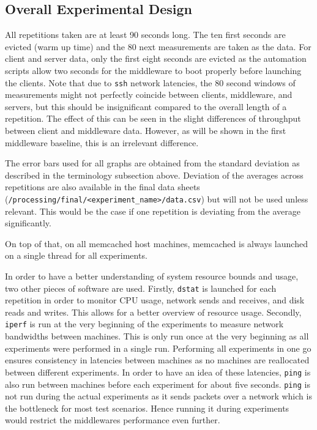\documentclass[11pt,a4paper]{article}
\begin{document}
\subsection{Overall Experimental Design}
All repetitions taken are at least 90 seconds long. The ten first seconds are evicted (warm up time) and the 80 next measurements are taken as the data. For client and server data, only the first eight seconds are evicted as the automation scripts allow two seconds for the middleware to boot properly before launching the clients. Note that due to \texttt{ssh} network latencies, the 80 second windows of measurements might not perfectly coincide between clients, middleware, and servers, but this should be insignificant compared to the overall length of a repetition. The effect of this can be seen in the slight differences of throughput between client and middleware data. However, as will be shown in the first middleware baseline, this is an irrelevant difference.

The error bars used for all graphs are obtained from the standard deviation as described in the terminology subsection above. Deviation of the averages across repetitions are also available in the final data sheets (\texttt{/processing/final/<experiment_name>/data.csv}) but will not be used unless relevant. This would be the case if one repetition is deviating from the average significantly.

On top of that, on all memcached host machines, memcached is always launched on a single thread for all experiments.

In order to have a better understanding of system resource bounds and usage, two other pieces of software are used. Firstly, \texttt{dstat} is launched for each repetition in order to monitor CPU usage, network sends and receives, and disk reads and writes. This allows for a better overview of resource usage. Secondly, \texttt{iperf} is run at the very beginning of the experiments to measure network bandwidths between machines. This is only run once at the very beginning as all experiments were performed in a single run. Performing all experiments in one go ensures consistency in latencies between machines as no machines are reallocated between different experiments. In order to have an idea of these latencies, \texttt{ping} is also run between machines before each experiment for about five seconds. \texttt{ping} is not run during the actual experiments as it sends packets over a network which is the bottleneck for most test scenarios. Hence running it during experiments would restrict the middlewares performance even further.
\end{document}
